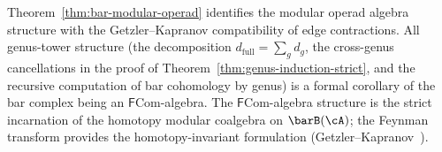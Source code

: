 \begin{remark}\label{rem:bar-modular-operad-consequences}%
%
Theorem~\ref{thm:bar-modular-operad} identifies the modular operad
algebra structure with the Getzler--Kapranov compatibility of
edge contractions. All genus-tower structure
(the decomposition $d_{\mathrm{full}} = \sum_g d_g$, the
cross-genus cancellations in the proof of
Theorem~\ref{thm:genus-induction-strict}, and the recursive computation of bar
cohomology by genus) is a formal corollary of the bar complex being an
$\mathsf{F}\mathrm{Com}$-algebra.
The $\mathsf{F}\mathrm{Com}$-algebra structure is the strict
incarnation of the homotopy modular coalgebra on $\barB(\cA)$;
the Feynman transform provides the homotopy-invariant formulation
(Getzler--Kapranov~\cite[\S5]{GetzlerKapranov98}).
\end{remark}

